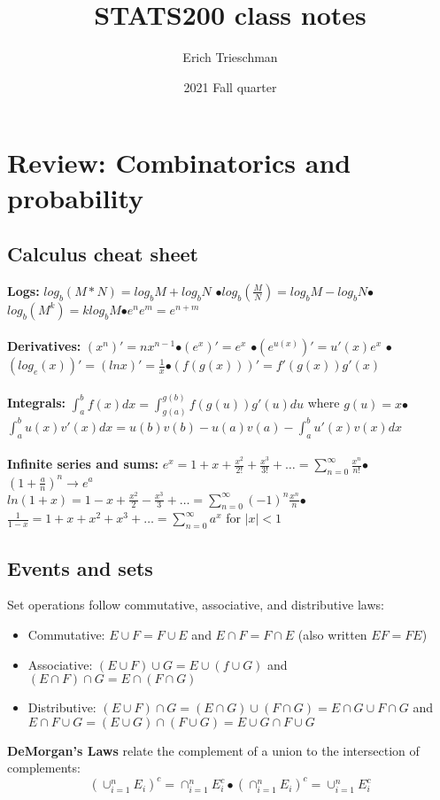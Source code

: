 \documentclass{article}
\title{STATS200 class notes}
\author{Erich Trieschman}
\date{2021 Fall quarter}
\newcommand{\abs}[1]{\lvert#1\rvert}
\newcommand{\blabel}{$\bullet$}
\begin{document}
\maketitle

\tableofcontents

\section{Review: Combinatorics and probability}
\subsection{Calculus cheat sheet}
\textbf{Logs:} $log_b(M * N) = log_bM + log_bN$ \blabel $log_b(\frac{M}{N}) = log_bM - log_bN$\blabel $log_b(M^k) = klog_bM$\blabel $e^ne^m = e^{n+m}$\\\\
\textbf{Derivatives:} $(x^n)' = nx^{n-1}$\blabel $(e^x)' = e^x$ \blabel $(e^{u(x)})' = u'(x)e^x$ \blabel $(log_e(x))' = (lnx)' = \frac{1}{x}$\blabel $(f(g(x)))' = f'(g(x))g'(x)$\\\\
\textbf{Integrals: } $\int_a^b f(x)dx = \int_{g(a)}^{g(b)}f(g(u))g'(u)du$ where $g(u) = x$\blabel $\int_a^b u(x)v'(x)dx = u(b)v(b) - u(a)v(a) - \int_a^b u'(x)v(x)dx$\\\\
\textbf{Infinite series and sums:} $e^x = 1 + x + \frac{x^2}{2!} + \frac{x^3}{3!} + \dots = \sum_{n=0}^\infty \frac{x^n}{n!}$\blabel $(1 + \frac{a}{n})^n \longrightarrow e^a$\\
$ln(1 + x) = 1 - x + \frac{x^2}{2} - \frac{x^3}{3} + \dots = \sum_{n=0}^\infty (-1)^n\frac{x^n}{n}$\blabel $\frac{1}{1-x} = 1 + x + x^2 + x^3 + \dots = \sum_{n=0}^\infty a^x$ for $\abs{x} < 1$

\subsection{Events and sets}
Set operations follow commutative, associative, and distributive laws:
\begin{itemize}
    \item Commutative: $E \cup F = F \cup E$ and $E\cap F = F \cap E $ (also written $EF = FE$)
    \item Associative: $(E\cup F)\cup G = E \cup (f\cup G)$ and $(E\cap F)\cap G = E\cap(F\cap G)$
    \item Distributive: $(E\cup F)\cap G = (E\cap G) \cup (F \cap G) = E\cap G \cup F \cap G$ and $E\cap F\cup G = (E\cup G) \cap (F \cup G) = E\cup G \cap F \cup G$
\end{itemize}
\textbf{DeMorgan's Laws} relate the complement of a union to the intersection of complements:
\begin{equation*}
    (\cup_{i=1}^n E_i)^c = \cap_{i=1}^nE_i^c \bullet (\cap_{i=1}^n E_i)^c = \cup_{i=1}^nE_i^c
\end{equation*}
\end{document}
